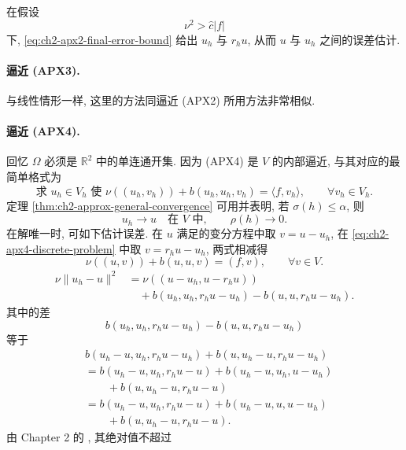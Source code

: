 \hypertarget{chapter-02-page-158}{}
在假设
\begin{equation}
\nu^2>\widehat c|f|
\label{eq:ch2-apx2-error-condition}
\end{equation}
下, \eqref{eq:ch2-apx2-final-error-bound} 给出 $u_h$ 与 $r_hu$, 从而 $u$ 与 $u_h$ 之间的误差估计.

\paragraph{逼近 (APX3).}
与线性情形一样, 这里的方法同逼近 (APX2) 所用方法非常相似.

\paragraph{逼近 (APX4).}
回忆 $\Omega$ 必须是 $\mathbb R^2$ 中的单连通开集. 因为 (APX4) 是 $V$ 的内部逼近, 与其对应的最简单格式为
\begin{equation}
\text{求 }u_h\in V_h\text{ 使 }
\nu((u_h,v_h))+b(u_h,u_h,v_h)=\langle f,v_h\rangle,
\qquad\forall v_h\in V_h.
\label{eq:ch2-apx4-discrete-problem}
\end{equation}
定理 \ref{thm:ch2-approx-general-convergence} 可用并表明, 若 $\sigma(h)\leq\alpha$, 则
\begin{equation}
u_h\longrightarrow u\quad\text{在 }V\text{ 中},
\qquad\rho(h)\to0.
\label{eq:ch2-apx4-convergence}
\end{equation}
在解唯一时, 可如下估计误差. 在 $u$ 满足的变分方程中取 $v=u-u_h$, 在 \eqref{eq:ch2-apx4-discrete-problem} 中取 $v=r_hu-u_h$, 两式相减得
\[
\nu((u,v))+b(u,u,v)=(f,v),
\qquad\forall v\in V.
\]
\begin{equation}
\begin{aligned}
\nu\lVert u_h-u\rVert^2
&=\nu((u-u_h,u-r_hu))\\
&\quad+b(u_h,u_h,r_hu-u_h)-b(u,u,r_hu-u_h).
\end{aligned}
\label{eq:ch2-apx4-error-identity}
\end{equation}
其中的差
\[
b(u_h,u_h,r_hu-u_h)-b(u,u,r_hu-u_h)
\]
等于
\[
\begin{aligned}
&b(u_h-u,u_h,r_hu-u_h)+b(u,u_h-u,r_hu-u_h)\\
&=b(u_h-u,u_h,r_hu-u)+b(u_h-u,u_h,u-u_h)\\
&\qquad+b(u,u_h-u,r_hu-u)\\
&=b(u_h-u,u_h,r_hu-u)+b(u_h-u,u,u-u_h)\\
&\qquad+b(u,u_h-u,r_hu-u).
\end{aligned}
\]
由 Chapter 2 的 , 其绝对值不超过
